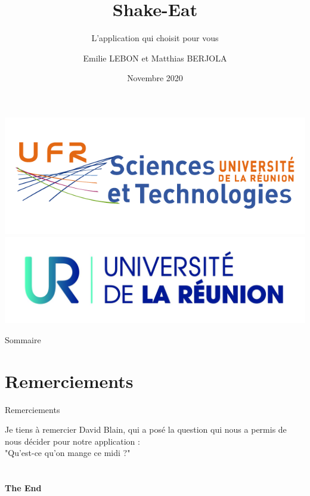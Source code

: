 \documentclass[aspectratio=43]{beamer}
\title{Shake-Eat} %
\subtitle{L'application qui choisit pour vous}
\author[Emilie LEBON et Matthias BERJOLA]{Emilie LEBON et Matthias BERJOLA}
\begin{document}
\centering \includegraphics[height = 0.25 \textheight]{images/ufr-st.png}
\centering \includegraphics[height =0.25 \textheight]{images/logo_universite.jpg}
\date{Novembre 2020}


    
    \frame{\titlepage}
    
    \begin{frame}{Sommaire}
        \tableofcontents
    \end{frame}
    
    
    
    
    
    
    \section*{Remerciements} %
        \begin{frame}{Remerciements}
        \begin{center}
            
       
            Je tiens à remercier David Blain, qui a posé la question qui nous a permis de nous décider pour notre application : \\ "Qu'est-ce qu'on mange ce midi ?"
        \end{center}
        \end{frame}
    
   

    \section{}
    \begin{frame}{}
        \centering
            \Huge\bfseries
        \textcolor{rose}{The End}
    \end{frame}
\end{document}
